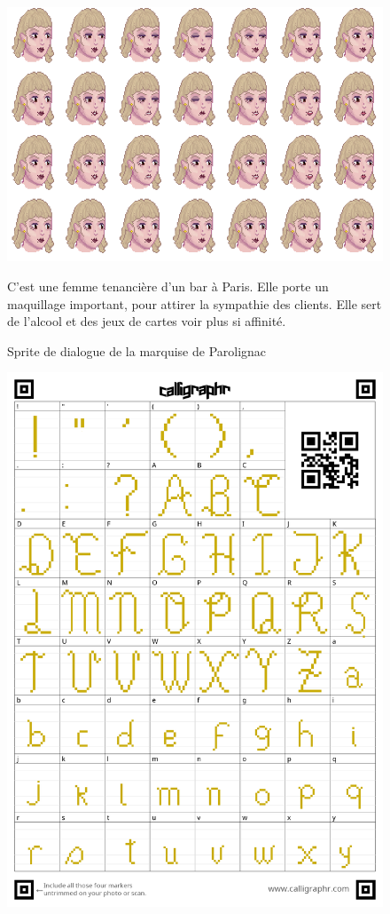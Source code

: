 \documentclass[11pt]{article}
\begin{document}
\begin{appendices}
\begin{figure}[H]
\includegraphics[scale=0.4]{marquiseFaceAnimation}
\centering
\caption{Sprite de dialogue de la marquise de Parolignac}
C'est une femme tenancière d'un bar à Paris. Elle porte un maquillage important, pour attirer la sympathie des clients. Elle sert de l'alcool et des jeux de cartes voir plus si affinité.
\end{figure}
\begin{figure}[H]
\includegraphics[scale=0.2]{fontPage1}

\end{figure}
\end{appendices}
\end{document}
